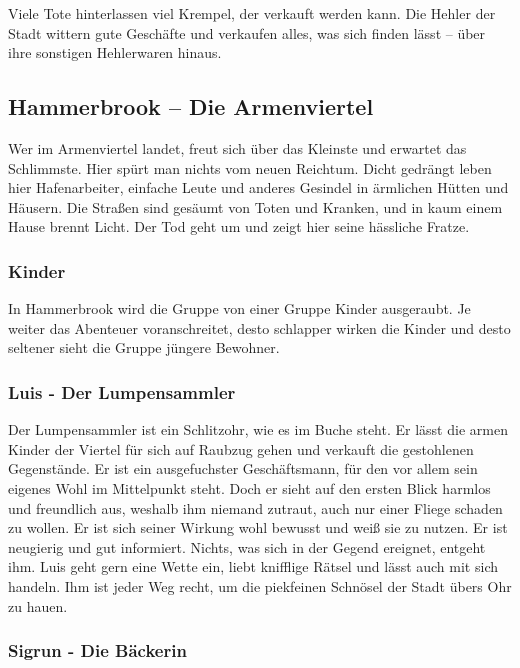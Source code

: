 Viele Tote hinterlassen viel Krempel, der verkauft werden kann. Die Hehler der Stadt wittern gute Geschäfte und verkaufen alles, was sich finden lässt – über ihre sonstigen Hehlerwaren hinaus.


\subsection{Hammerbrook – Die Armenviertel}

Wer im Armenviertel landet, freut sich über das Kleinste und erwartet das Schlimmste. Hier spürt man nichts vom neuen Reichtum. Dicht gedrängt leben hier Hafenarbeiter, einfache Leute und anderes Gesindel in ärmlichen Hütten und Häusern. Die Straßen sind gesäumt von Toten und Kranken, und in kaum einem Hause brennt Licht. Der Tod geht um und zeigt hier seine hässliche Fratze.

\subsubsection*{Kinder}
\label{Kinder}

In Hammerbrook wird die Gruppe von einer Gruppe Kinder ausgeraubt. Je weiter das Abenteuer voranschreitet, desto schlapper wirken die Kinder und desto seltener sieht die Gruppe jüngere Bewohner.

\subsubsection*{Luis - Der Lumpensammler}
\label{Luis}

Der Lumpensammler ist ein Schlitzohr, wie es im Buche steht. Er lässt die armen Kinder der Viertel für sich auf Raubzug gehen und verkauft die gestohlenen Gegenstände. Er ist ein ausgefuchster Geschäftsmann, für den vor allem sein eigenes Wohl im Mittelpunkt steht. Doch er sieht auf den ersten Blick harmlos und freundlich aus, weshalb ihm niemand zutraut, auch nur einer Fliege schaden zu wollen. Er ist sich seiner Wirkung wohl bewusst und weiß sie zu nutzen. Er ist neugierig und gut informiert. Nichts, was sich in der Gegend ereignet, entgeht ihm. Luis geht gern eine Wette ein, liebt knifflige Rätsel und lässt auch mit sich handeln. Ihm ist jeder Weg recht, um die piekfeinen Schnösel der Stadt übers Ohr zu hauen.

\subsubsection*{Sigrun - Die Bäckerin}
\label{Sigrun}

